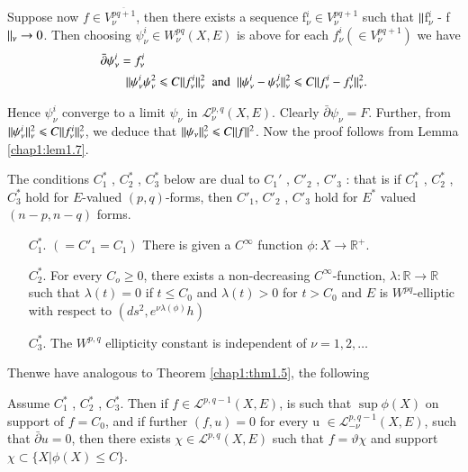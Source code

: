 Suppose now $f \in V^{\overline{pq+1}}_\nu$, then there exists a
sequence f$^i_\nu \in V^{pq+1}_\nu$ such that $\Arrowvert$f$^i_\nu $ -
f $\Arrowvert_\nu \rightarrow 0$. Then choosing $\psi^i_\nu \in
W^{pq}_\nu  (X,E)$ is above for each $f^i_\nu (\in V^{pq+1}_\nu)$ we
have  
\begin{align*}
& \bar{\partial} \psi_\nu^i = f^i_\nu\\
& \qquad \Arrowvert \psi_\nu^i \psi_\nu^2 \leqslant C \Arrowvert f^i_\nu
\Arrowvert^2_\nu \; \text{ and } \;  \Arrowvert \psi^i_\nu - \psi^j_\nu
\Arrowvert^2_\nu \leqslant C \Arrowvert f^i_\nu  - f^l_\nu
\Arrowvert^2_\nu. 
\end{align*}

Hence $\psi^i_\nu$ converge to a limit $\psi_\nu$ in
$\mathcal{L}^{p,q}_\nu(X,E)$. Clearly $\bar{\partial}\psi_\nu =
F$. Further, from $\Arrowvert \psi^i_\nu \Arrowvert^2_\nu \leqslant C
\Arrowvert f^i_\nu \Arrowvert^2_\nu$, we deduce that $\Arrowvert
\psi_\nu \Arrowvert_\nu^2 \leqslant  C \Arrowvert f
\Arrowvert^2$. Now the proof follows from Lemma \ref{chap1:lem1.7}.  

The conditions $C_1^*$ , $C^*_2$ , $C^*_3$ below are dual to
$C_1'$ , $C'_2$ , $C'_3$ : that is if $C_1^*$ ,
$C^*_2$ , $C^*_3$  hold for $E$-valued $(p,q)$-forms, then $C'_1$,
$C'_2$ , $C'_3$ hold  for $E^*$ valued $(n-p,n-q)$ forms. 
\begin{enumerate}
\item[$C^*_1$.] $(= C'_1 = C_1)$ There is given a $C^\infty$ function
$\phi : X\rightarrow \mathbb{R}^+$.

\item[$C^*_2$.] For every $C_o \geqslant
0$, there exists a non-decreasing $C^\infty$-function, $\lambda :
\mathbb{R}\rightarrow \mathbb{R}$ such that $\lambda(t) = 0$ if
$t\leqslant C_0$ and $\lambda (t) > 0$ for $t >  C_0$ and $E$ is
$W^{pq}$-elliptic with respect to $(ds^2 ,e^{\nu \lambda(\phi)}h)$

\item[$C^*_3$.] The $W^{p,q}$ ellipticity constant is independent of $\nu =
1,2,\ldots$   
\end{enumerate}

Then\pageoriginale we have analogous to Theorem \ref{chap1:thm1.5}, the following 


\begin{theorem}\label{chap1:thm1.6}%
  Assume $C_1^*$ , $C^*_2$ , $C^*_3$. Then if $ f \in
  \mathcal{L}^{p,q-1} (X,E)$, is such that $\sup \phi (X)$ on support of
  $f= C_0$, and if further $(f,u) = 0$ for every u $\in
  \mathcal{L}^{p,q-1}_{-\nu} (X,E)$, such that $\bar{\partial} u=0$,
  then there exists $\chi \in \mathcal{L}^{p,q} (X,E)$ such that $f=
  \vartheta \chi$ and support $\chi \subset\{X|\phi(X)\leq  C
  \}$. 
\end{theorem}

